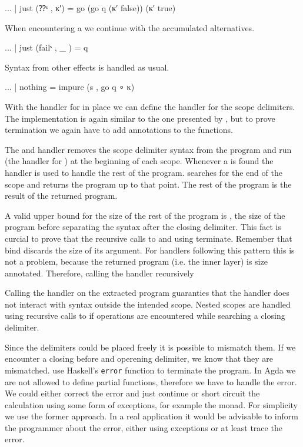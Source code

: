 \begin{AgdaAlign}
\begin{code}
    ... | just (⁇ˢ     , κ′)  = go (go q (κ′ false)) (κ′ true)
\end{code}
When encountering a  we continue with the accumulated
alternatives.

\begin{code}
    ... | just (failˢ  , _ )  = q
\end{code}
Syntax from other effects is handled as usual.

\begin{code}
    ... | nothing             = impure (s , go q ∘ κ)
\end{code}
\end{AgdaAlign}
With the handler for  in place we can define the handler for the
scope delimiters.
The implementation is again similar to the one presented by
\textcite{DBLP:conf/haskell/WuSH14}, but to prove termination we again have to
add  annotations to the functions.

The  and  handler removes the scope
delimiter syntax from the program and run  (the handler
for ) at the beginning of each scope.
Whenever a  is found the handler  is
used to handle the rest of the program.
 searches for the end of the scope and returns the program
up to that point.
The rest of the program is the result of the returned program.

A valid upper bound for the size of the rest of the program is ,
the size of the program before separating the syntax after the closing delimiter.
This fact is curcial to prove that the recursive calls to  and
 using \AgdaFunction{>>=} terminate.
Remember that bind discards the size of its argument.
For handlers following this pattern this is not a problem, because the returned
program (i.e. the inner  layer) is size annotated.
Therefore, calling the handler recursively 

Calling the handler on the extracted program guaranties that the handler does
not interact with syntax outside the intended scope.
Nested scopes are handled using recursive calls to  if
 operations are encountered while searching a closing
delimiter.

Since the delimiters could be placed freely it is possible to mismatch them.
If we encounter a closing before and operening delimiter, we know that they are
mismatched.
\textcite{DBLP:conf/haskell/WuSH14} use Haskell's \texttt{error} function to
terminate the program.
In Agda we are not allowed to define partial functions, therefore we have to
handle the error.
We could either correct the error and just continue or short circuit the
calculation using some form of exceptions, for example the 
monad.
For simplicity we use the former approach.
In a real application it would be advisable to inform the programmer about the
error, either using exceptions or at least trace the error.

